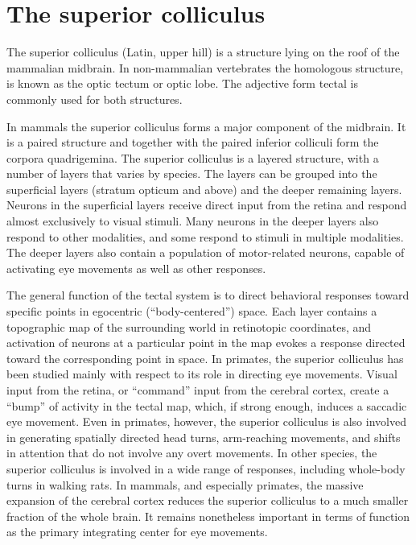 \documentclass[]{book}
\begin{document}
\hypertarget{the-superior-colliculus}{%
\section{The superior colliculus}\label{the-superior-colliculus}}

The superior colliculus (Latin, upper hill) is a structure lying on the roof of the mammalian midbrain. In non-mammalian vertebrates the homologous structure, is known as the optic tectum or optic lobe. The adjective form tectal is commonly used for both structures.

In mammals the superior colliculus forms a major component of the midbrain. It is a paired structure and together with the paired inferior colliculi form the corpora quadrigemina. The superior colliculus is a layered structure, with a number of layers that varies by species. The layers can be grouped into the superficial layers (stratum opticum and above) and the deeper remaining layers. Neurons in the superficial layers receive direct input from the retina and respond almost exclusively to visual stimuli. Many neurons in the deeper layers also respond to other modalities, and some respond to stimuli in multiple modalities. The deeper layers also contain a population of motor-related neurons, capable of activating eye movements as well as other responses.

The general function of the tectal system is to direct behavioral responses toward specific points in egocentric (``body-centered'') space. Each layer contains a topographic map of the surrounding world in retinotopic coordinates, and activation of neurons at a particular point in the map evokes a response directed toward the corresponding point in space. In primates, the superior colliculus has been studied mainly with respect to its role in directing eye movements. Visual input from the retina, or ``command'' input from the cerebral cortex, create a ``bump'' of activity in the tectal map, which, if strong enough, induces a saccadic eye movement. Even in primates, however, the superior colliculus is also involved in generating spatially directed head turns, arm-reaching movements, and shifts in attention that do not involve any overt movements. In other species, the superior colliculus is involved in a wide range of responses, including whole-body turns in walking rats. In mammals, and especially primates, the massive expansion of the cerebral cortex reduces the superior colliculus to a much smaller fraction of the whole brain. It remains nonetheless important in terms of function as the primary integrating center for eye movements.
\end{document}
